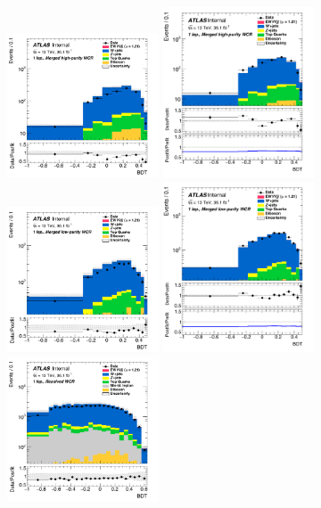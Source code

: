 \begin{figure}[!ht]
	\centering
	\includegraphics[width=0.4\textwidth]{Chapter5/BDT_1lep_HP_WCR_prefit.pdf}	\includegraphics[width=0.4\textwidth]{Chapter5/BDT_1lep_HP_WCR_postfit.pdf}
	\includegraphics[width=0.4\textwidth]{Chapter5/BDT_1lep_LP_WCR_prefit.pdf}
	\includegraphics[width=0.4\textwidth]{Chapter5/BDT_1lep_LP_WCR_postfit.pdf}
	\includegraphics[width=0.4\textwidth]{Chapter5/BDT_1lep_res_WCR_prefit.pdf}

\end{figure}
